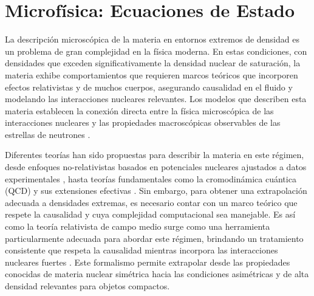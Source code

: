 

\thispagestyle{fancy}
\chapter{Microfísica: Ecuaciones de Estado}
\label{chap:microfisica}

La descripción microscópica de la materia en entornos extremos de densidad es un problema de gran complejidad en la física moderna. En estas condiciones, con densidades que exceden significativamente la densidad nuclear de saturación, la materia exhibe comportamientos que requieren marcos teóricos que incorporen efectos relativistas y de muchos cuerpos, asegurando causalidad en el fluido y modelando las interacciones nucleares relevantes. Los modelos que describen esta materia establecen la conexión directa entre la física microscópica de las interacciones nucleares y las propiedades macroscópicas observables de las estrellas de neutrones \cite{oppenheimerMassiveNeutronCores1939}.

Diferentes teorías han sido propuestas para describir la materia en este régimen, desde enfoques no-relativistas basados en potenciales nucleares ajustados a datos experimentales \cite{myersNuclearPropertiesAccording1996}, hasta teorías fundamentales como la cromodinámica cuántica (QCD) y sus extensiones efectivas \cite{drischlerGroundingNuclearPhysics2021}. Sin embargo, para obtener una extrapolación adecuada a densidades extremas, es necesario contar con un marco teórico que respete la causalidad y cuya complejidad computacional sea manejable. Es así como la teoría relativista de campo medio surge como una herramienta particularmente adecuada para abordar este régimen, brindando un tratamiento consistente que respeta la causalidad mientras incorpora las interacciones nucleares fuertes \cite{glendenningCompactStarsNuclear2000}. Este formalismo permite extrapolar desde las propiedades conocidas de materia nuclear simétrica hacia las condiciones asimétricas y de alta densidad relevantes para objetos compactos.

